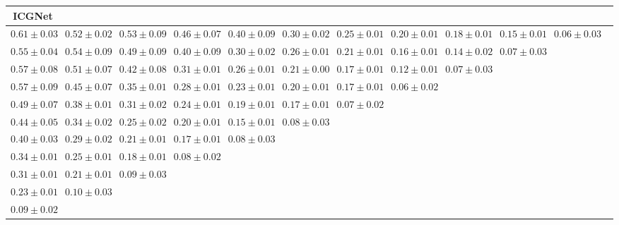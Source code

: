 \begin{table}[ht]
{{\begin{adjustbox}{width=\textwidth}
\begin{tabular}{cccccccccccc}
\hline
ICGNet &  &  &  &  &  &  &  &  &  & \\
\hline
$0.61 \pm 0.03$ & $0.52 \pm 0.02$ & $0.53 \pm 0.09$ & $0.46 \pm 0.07$ & $0.40 \pm 0.09$ & $0.30 \pm 0.02$ & $0.25 \pm 0.01$ & $0.20 \pm 0.01$ & $0.18 \pm 0.01$ & $0.15 \pm 0.01$ & $0.06 \pm 0.03$ &  \\
$0.55 \pm 0.04$ & $0.54 \pm 0.09$ & $0.49 \pm 0.09$ & $0.40 \pm 0.09$ & $0.30 \pm 0.02$ & $0.26 \pm 0.01$ & $0.21 \pm 0.01$ & $0.16 \pm 0.01$ & $0.14 \pm 0.02$ & $0.07 \pm 0.03$ &  &  \\
$0.57 \pm 0.08$ & $0.51 \pm 0.07$ & $0.42 \pm 0.08$ & $0.31 \pm 0.01$ & $0.26 \pm 0.01$ & $0.21 \pm 0.00$ & $0.17 \pm 0.01$ & $0.12 \pm 0.01$ & $0.07 \pm 0.03$ &  &  &  \\
$0.57 \pm 0.09$ & $0.45 \pm 0.07$ & $0.35 \pm 0.01$ & $0.28 \pm 0.01$ & $0.23 \pm 0.01$ & $0.20 \pm 0.01$ & $0.17 \pm 0.01$ & $0.06 \pm 0.02$ &  &  &  &  \\
$0.49 \pm 0.07$ & $0.38 \pm 0.01$ & $0.31 \pm 0.02$ & $0.24 \pm 0.01$ & $0.19 \pm 0.01$ & $0.17 \pm 0.01$ & $0.07 \pm 0.02$ &  &  &  &  &  \\
$0.44 \pm 0.05$ & $0.34 \pm 0.02$ & $0.25 \pm 0.02$ & $0.20 \pm 0.01$ & $0.15 \pm 0.01$ & $0.08 \pm 0.03$ &  &  &  &  &  &  \\
$0.40 \pm 0.03$ & $0.29 \pm 0.02$ & $0.21 \pm 0.01$ & $0.17 \pm 0.01$ & $0.08 \pm 0.03$ &  &  &  &  &  &  &  \\
$0.34 \pm 0.01$ & $0.25 \pm 0.01$ & $0.18 \pm 0.01$ & $0.08 \pm 0.02$ &  &  &  &  &  &  &  &  \\
$0.31 \pm 0.01$ & $0.21 \pm 0.01$ & $0.09 \pm 0.03$ &  &  &  &  &  &  &  &  &  \\
$0.23 \pm 0.01$ & $0.10 \pm 0.03$ &  &  &  &  &  &  &  &  &  &  \\
$0.09 \pm 0.02$ &  &  &  &  &  &  &  &  &  &  &  \\




\end{tabular}
\end{adjustbox}}}
\end{table}
